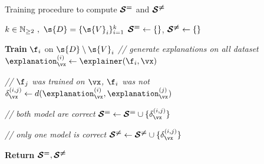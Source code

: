 \begin{algorithm}[h]
\caption{Training procedure to compute $\boldsymbol{\mathcal{S}^{ = }}$ and $\boldsymbol{\mathcal{S}^{ \ne }}$}
\begin{algorithmic}
\label{alg:mege:procedure}

\REQUIRE $k \in \mathbb{N}_{\geq 2} \ ,\ \s{D} = \{ \s{V}_i \}_{i=1}^k $
\STATE $\boldsymbol{\mathcal{S}^{ = }} \gets{} \{\}$, $\boldsymbol{\mathcal{S}^{ \ne }} \gets{} \{\}$

\STATE \textbf{Train} $\f_i$ on $\s{D} \setminus \s{V}_i$
\STATE \textit{// generate explanations on all dataset} 
\STATE $ \explanation_{\vx}^{(i)} \gets{} \explainer(\f_i, \vx)$
\ENDFOR
\ENDFOR


\STATE \textit{// $\f_{j}$ was trained on $\vx$, $\f_{i}$ was not} 
\STATE $ \delta_{\vx}^{(i,j)} \gets{} d( \explanation_{\vx}^{(i)}, \explanation_{\vx}^{(j)} )$

\STATE \textit{// both model are correct}
\STATE $\Setm \gets{} \Setm \cup \{ \delta_{\vx}^{(i,j)} \}$

\STATE \textit{// only one model is correct}
\STATE $\Setp \gets{} \Setp \cup \{ \delta_{\vx}^{(i,j)} \}$

\ENDIF
\ENDFOR
\ENDFOR
\ENDFOR

\STATE \textbf{Return} $\boldsymbol{\mathcal{S}^{ = }}, \boldsymbol{\mathcal{S}^{ \ne }}$

\end{algorithmic}
\end{algorithm}
